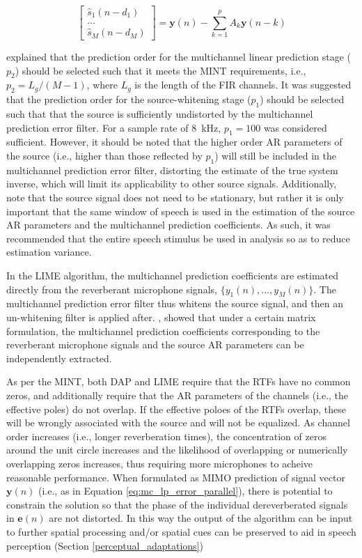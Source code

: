 \begin{equation}
	\begin{bmatrix} \hat{s}_1(n-d_1) \\ \dots \\ \hat{s}_M(n-d_M) \end{bmatrix} =
	\boldsymbol{y}(n) - \sum_{k=1}^{p} A_k \boldsymbol{y}(n-k)
\end{equation}

\cite{triki2006delay} explained that the prediction order for the multichannel linear prediction stage ($p_2$) should be selected such that it meets the MINT requirements, i.e., $p_2=L_g/(M-1)$, where $L_g$ is the length of the FIR channels. It was suggested that the prediction order for the source-whitening stage ($p_1$) should be selected such that that the source is sufficiently undistorted by the multichannel prediction error filter. For a sample rate of \qty{8}{\kilo\hertz}, $p_1=100$ was considered sufficient. However, it should be noted that the higher order AR parameters of the source (i.e., higher than those reflected by $p_1$) will still be included in the multichannel prediction error filter, distorting the estimate of the true system inverse, which will limit its applicability to other source signals. Additionally, note that the source signal does not need to be stationary, but rather it is only important that the same window of speech is used in the estimation of the source AR parameters and the multichannel prediction coefficients. As such, it was recommended that the entire speech stimulus be used in analysis so as to reduce estimation variance.


In the LIME algorithm, the multichannel prediction coefficients are estimated directly from the reverberant microphone signals, $\{y_1(n), \dots, y_M(n)\}$. The multichannel prediction error filter thus whitens the source signal, and then an un-whitening filter is applied after. \cite{delcroix2007precise}, showed that under a certain matrix formulation, the multichannel prediction coefficients corresponding to the reverberant microphone signals and the source AR parameters can be independently extracted.

As per the MINT, both DAP and LIME require that the RTFs have no common zeros, and additionally require that the AR parameters of the channels (i.e., the effective poles) do not overlap. If the effective poloes of the RTFs overlap, these will be wrongly associated with the source and will not be equalized. As channel order increases (i.e., longer reverberation times), the concentration of zeros around the unit circle increases and the likelihood of overlapping or numerically overlapping zeros increases, thus requiring more microphones to acheive reasonable performance. When formulated as MIMO prediction of signal vector $\boldsymbol{y}(n)$ (i.e., as in Equation \ref{eq:mc_lp_error_parallel}), there is potential to constrain the solution so that the phase of the individual dereverberated signals in $\boldsymbol{e}(n)$ are not distorted. In this way the output of the algorithm can be input to further spatial processing and/or spatial cues can be preserved to aid in speech perception (Section \ref{perceptual_adaptations}) 

